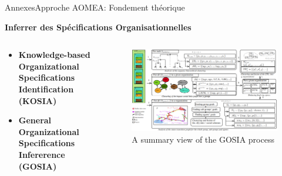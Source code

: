 \begin{frame}[allowframebreaks]{Annexes}{Approche AOMEA: Fondement théorique}

    \textbf{Inferrer des Spécifications Organisationnelles}

    \begin{columns}

        \begin{column}{0.3\textwidth}

            \begin{itemize}
                \item \textbf{Knowledge-based Organizational Specifications Identification (KOSIA)}
                \item \textbf{General Organizational Specifications Infererence (GOSIA)}
            \end{itemize}

        \end{column}

        \begin{column}{0.8\textwidth}
            \begin{figure}
                \centering
                \includegraphics[width=0.95\linewidth]{figures/GOSIA_view.png}
                \caption*{A summary view of the GOSIA process}
                \label{fig:gosia_process}
            \end{figure}
        \end{column}

    \end{columns}

\end{frame}



